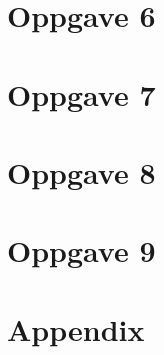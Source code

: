 \documentclass[norsk,a4paper,12pt]{article}
\begin{document}
\section*{Oppgave 6}


\section*{Oppgave 7}


\section*{Oppgave 8}


\section*{Oppgave 9}

\newpage

\section*{Appendix}
















\end{document}
